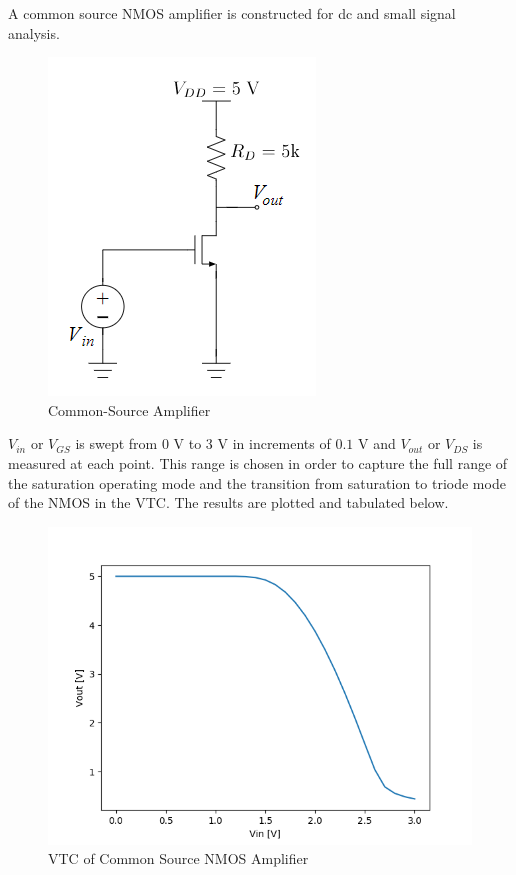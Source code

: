 A common source NMOS amplifier is constructed for dc and small signal analysis.

\FloatBarrier

\begin{figure}[h!]
	\centering
	\includegraphics[scale=0.75]{./images/circuit_2.PNG}
	\caption{Common-Source Amplifier}
	\label{fig:circuit_2}
\end{figure}

\FloatBarrier

$V_{in}$ or $V_{GS}$ is swept from $0$ \si{\volt} to $3$ \si{\volt} in increments of $0.1$ \si{\volt} and $V_{out}$ or $V_{DS}$ is measured at each point.
This range is chosen in order to capture the full range of the saturation operating mode and the transition from saturation to triode mode of the NMOS in the VTC.
The results are plotted and tabulated below.

\FloatBarrier

\begin{figure}[h!]
	\centering
	\includegraphics[scale=0.75]{./images/sim2_vtc.PNG}
	\caption{VTC of Common Source NMOS Amplifier}
	\label{fig:part2_vtc}
\end{figure}

